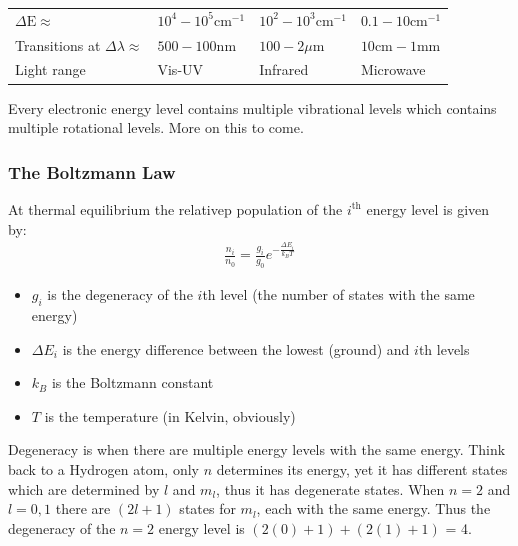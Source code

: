 \documentclass{article}
\newcommand{\NB}{{\large\lefthand}\quad}
\begin{document}
    \begin{tabular}[2cm]{l l l l}
        \(\Delta \text{E} \approx \) \hspace{1cm}  & \(10^{4} - 10^{5} \text{cm}^{-1}\) \hspace{0.8cm} & \(10^{2} - 10^{3} \text{cm}^{-1}\) \hspace{0.8cm} & \(0.1 - 10 \text{cm}^{-1}\)\\
        Transitions at \(\Delta \lambda \approx \) & \(500 - 100 \text{nm}\) \hspace{0.5cm} & \(100 - 2 \mu \text{m} \) \hspace{0.5cm} & \(10 \text{cm} - 1 \text{mm}\)\\
        Light range & Vis-UV & Infrared & Microwave\\
    \end{tabular}

    \vspace{1cm}
    Every electronic energy level contains multiple vibrational levels which contains multiple rotational levels.
    More on this to come. 

    \subsubsection{The Boltzmann Law} At thermal equilibrium the relativep population of the \(i^{\text{th}}\) energy level is given by:
    \begin{align*}
        \frac{n_i}{n_0} = \frac{g_i}{g_0}e^{-\frac{\Delta E_i}{k_B T}}
    \end{align*}
    \begin{itemize}
        \item \(g_i\) is the degeneracy of the \(i\)th level (the number of states with the same energy)
        \item \(\Delta E_i\) is the energy difference between the lowest (ground) and \(i\)th levels
        \item \(k_B\) is the Boltzmann constant
        \item $T$ is the temperature (in Kelvin, obviously)
    \end{itemize}

    \NB Degeneracy is when there are multiple energy levels with the same energy. Think back to a Hydrogen atom,
    only $n$ determines its energy, yet it has different states which are determined by $l$ and $m_l$, thus it 
    has degenerate states. When $n = 2$  and $l = 0, 1$ there are $(2l + 1)$ states for $m_l$, each with the
    same energy. Thus the degeneracy of the $n = 2$ energy level is $(2(0) + 1) + (2(1) + 1)$ = 4.\\
    
\end{document}
